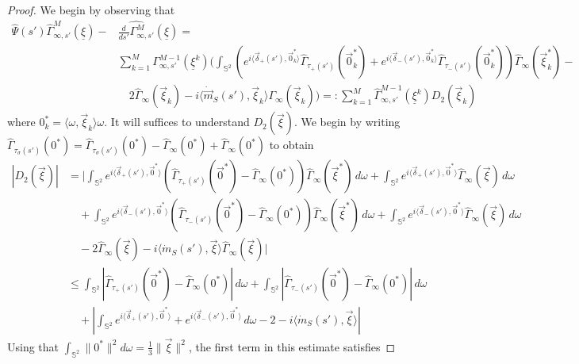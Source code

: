 \documentclass[10pt,a4paper]{amsart}
\newcommand\uxi{{\underline \xi}}
\newcommand\vxi{{\vec \xi}}
\begin{document}
\begin{proof}
We begin by observing that
\begin{align*}
\widehat\Psi(s') \widehat\Gamma^M_{\infty,s'}(\uxi) - &\widehat{\frac{d}{ds'}\Gamma^M_{\infty,s'}}(\uxi) =\\
& \sum_{k=1}^M \Gamma_{\infty,s'}^{M - 1}(\uxi^k) 
\bigg(\int_{\mathds S^2}\left(e^{i\langle\vec \delta_+(s'),\vec 0^*_k\rangle}\widehat \Gamma_{\tau_+(s')}(\vec
0^*_k)+e^{i\langle\vec \delta_-(s'),\vec 0^*_k\rangle}\widehat \Gamma_{\tau_-(s')}(\vec
0^*_k)\right)\widehat \Gamma_\infty(\vxi_k^*) -
\\ 
&\quad 2\widehat \Gamma_\infty(\vxi_k) - i\langle \dot{\vec m}_S(s'), \vxi_k\rangle \Gamma_\infty(\vxi_k)\bigg) =: 
\sum_{k=1}^M \widehat\Gamma_{\infty,s'}^{M - 1}(\uxi^k) D_2(\vxi_k)
\end{align*}
where $0^*_k=\langle\omega,\vxi_k\rangle\omega$.
It will suffices to understand $D_2(\vxi)$.
We begin by writing $\widehat \Gamma_{\tau_\sigma(s')}(0^*) = \widehat \Gamma_{\tau_\sigma(s')}(0^*) - \widehat 
\Gamma_{\infty}(0^*) + \widehat \Gamma_{\infty}(0^*)$ to obtain
\begin{align*}
|D_2(\vxi)|&= \bigg|\int_{\mathds S^2} e^{i\langle\vec \delta_+(s'),\vec 0^*\rangle}( \widehat 
\Gamma_{\tau_+(s')}(\vec 0^*)  - \widehat \Gamma_{\infty}(0^*))
\widehat\Gamma_{\infty}(\vxi^*) \, d\omega 
 + 
\int_{\mathds S^2} e^{i\langle\vec \delta_+(s'),\vec 0^*\rangle}\widehat \Gamma_{\infty}(\vxi) \, d\omega
\\
&\quad +
\int_{\mathds S^2} e^{i\langle\vec \delta_-(s'),\vec 0^*\rangle}( \widehat \Gamma_{\tau_-(s')}(\vec 0^*)  - \widehat 
\Gamma_{\infty}(0^*))
\widehat\Gamma_{\infty}(\vxi^*) \, d\omega 
 + 
\int_{\mathds S^2} e^{i\langle\vec \delta_-(s'),\vec 0^*\rangle}\widehat \Gamma_{\infty}(\vxi) \, d\omega
\\
&\quad -
2\widehat \Gamma_\infty(\vxi) - i\langle \dot{m}_S(s'), \vxi\rangle \widehat\Gamma_\infty(\vxi) \bigg| 
\\
&\leq 
\int_{\mathds S^2} \left| \widehat \Gamma_{\tau_+(s')}(\vec 0^*)  - \widehat \Gamma_{\infty}(0^*)\right|
 \, d\omega + \int_{\mathds S^2} \left| \widehat \Gamma_{\tau_-(s')}(\vec 0^*)  - \widehat \Gamma_{\infty}(0^*)\right|
 \, d\omega
 \\
 &\quad + 
 \left|\int_{\mathds S^2} e^{i\langle\vec \delta_+(s'),\vec 0^*\rangle} + e^{i\langle\vec \delta_-(s'),\vec 0^*\rangle} 
 \, d\omega - 2 - i\langle \dot{m}_S(s'), \vxi\rangle \right|
\end{align*}
Using that $\int_{\mathds S^2}\|0^*\|^2d\omega=\frac13\|\vxi\|^2$, the first term in this estimate satisfies

\end{proof}
\end{document}
